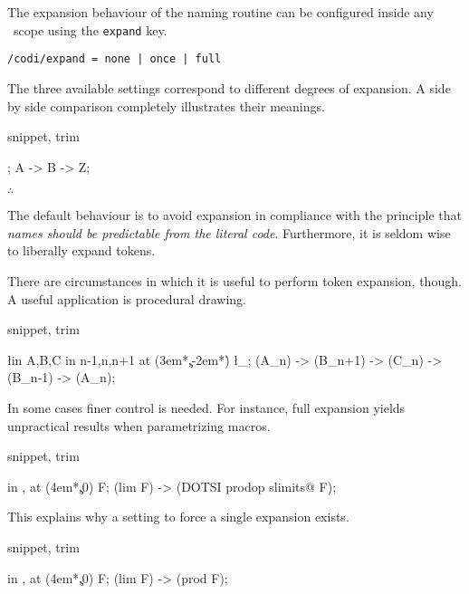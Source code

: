 The expansion behaviour of the naming routine can be configured
inside any \CoDi\ scope using the \lstinline!expand! key.

\begin{lstlisting}[style=metacode]
/codi/expand = none | once | full
\end{lstlisting}

The three available settings correspond to different degrees of expansion.
A side by side comparison completely illustrates their meanings.

\begin{tcblisting}{snippet, trim}
\begin{codi}
\def\B{Z}
\def\A{\B}
\obj{ |[expand=none]| \A &     %
      |[expand=once]| \A &     %
      |[expand=full]| \A \\ }; %
\mor A -> B -> Z;
\end{codi}
\end{tcblisting}

\hfill$\therefore$\hfill\null

The default behaviour is to avoid expansion in compliance with the principle
that \emph{names should be predictable from the \emph{literal} code}.
Furthermore, it is seldom wise to liberally expand tokens.

There are circumstances in which it is useful to perform token expansion,
though. A useful application is procedural drawing.

\begin{tcblisting}{snippet, trim}
\begin{codi}
\foreach [count=\r] \l in {A,B,C}
  \foreach [count=\c] \n in {n-1,n,n+1}
    \obj [expand=full] at (3em*\c,-2em*\r) {\l_{\n}};
\mor (A_{n}) -> (B_{n+1}) -> (C_{n}) -> (B_{n-1}) -> (A_{n});
\end{codi}
\end{tcblisting}

In some cases finer control is needed. For instance, full expansion
yields unpractical results when parametrizing macros.

\begin{tcblisting}{snippet, trim}
\begin{codi}
\foreach [count=\c] \m in {\lim,\prod}
  \obj [expand=full] at (4em*\c,0) {\m F};
\mor (lim F) -> (DOTSI prodop slimits@ F);
\end{codi}
\end{tcblisting}

This explains why a setting to force a single expansion exists.

\begin{tcblisting}{snippet, trim}
\begin{codi}
\foreach [count=\c] \m in {\lim,\prod}
  \obj [expand=once] at (4em*\c,0) {\m F};
\mor (lim F) -> (prod F);
\end{codi}
\end{tcblisting}
